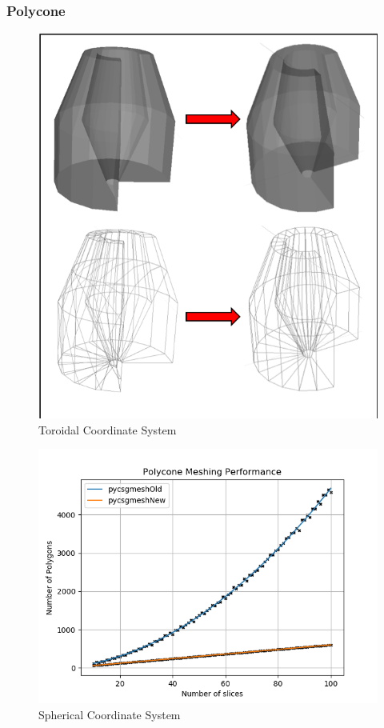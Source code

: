 \documentclass[12pt,a4paper]{article}
\begin{document}
\newpage
\subsubsection{Polycone}

\begin{figure}[h!]
\centering
\includegraphics[scale=0.5]{Images//Meshes//polycone.png}
\caption[width=\columnwidth]{Toroidal Coordinate System}
\label{conts}
\end{figure}

\begin{figure}[h!]
\centering
\includegraphics[scale=0.5]{Images//Quad_fits//Polycone_quad.png}
\caption[width=\columnwidth]{Spherical Coordinate System}
\label{conts}
\end{figure}
\end{document}
